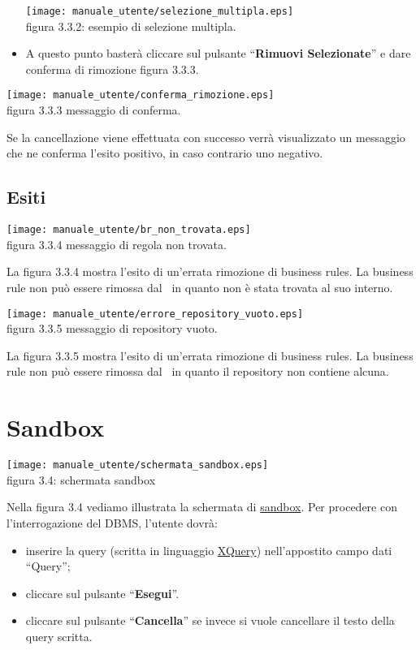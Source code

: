 \begin{center}
\begin{itemize}
\begin{center}
\texttt{[image: manuale\_utente/selezione\_multipla.eps]}\\
 figura 3.3.2: esempio di selezione multipla.
\end{center} 

\item A questo punto baster\`a cliccare sul pulsante ``\textbf{Rimuovi Selezionate}'' e dare conferma di rimozione figura 3.3.3.  
\end{itemize}

\begin{center}
\texttt{[image: manuale\_utente/conferma\_rimozione.eps]}\\
 figura 3.3.3 messaggio di conferma.
\end{center} 

Se la cancellazione viene effettuata con successo verr\`a visualizzato un messaggio che ne conferma l'esito positivo, in caso contrario uno negativo.
\subsection{Esiti}
 
\begin{center}
\texttt{[image: manuale\_utente/br\_non\_trovata.eps]}\\
 figura 3.3.4 messaggio di regola non trovata.
\end{center} 
La figura 3.3.4 mostra l'esito di un'errata rimozione di business rules. La business rule non pu\`o essere rimossa dal \rp\ in quanto non \`e stata trovata al suo interno.

\begin{center}
\texttt{[image: manuale\_utente/errore\_repository\_vuoto.eps]}\\
 figura 3.3.5 messaggio di repository vuoto.
\end{center} 
La figura 3.3.5 mostra l'esito di un'errata rimozione di business rules. La business rule non pu\`o essere rimossa dal \rp\ in quanto il repository non contiene alcuna.

\section{Sandbox}
\begin{center}
 \texttt{[image: manuale\_utente/schermata\_sandbox.eps]} \\
 figura 3.4: schermata sandbox
\end{center}
Nella figura 3.4 vediamo illustrata la schermata di \underline{sandbox}. Per procedere con l'interrogazione del DBMS, l'utente dovr\`a:
\begin{itemize}
\item inserire la query (scritta in linguaggio \underline{XQuery}) nell'appostito campo dati ``Query'';
\item cliccare sul pulsante ``\textbf{Esegui}''.
\item cliccare sul pulsante ``\textbf{Cancella}'' se invece si vuole cancellare il testo della query scritta.
\end{itemize}


\end{center}
